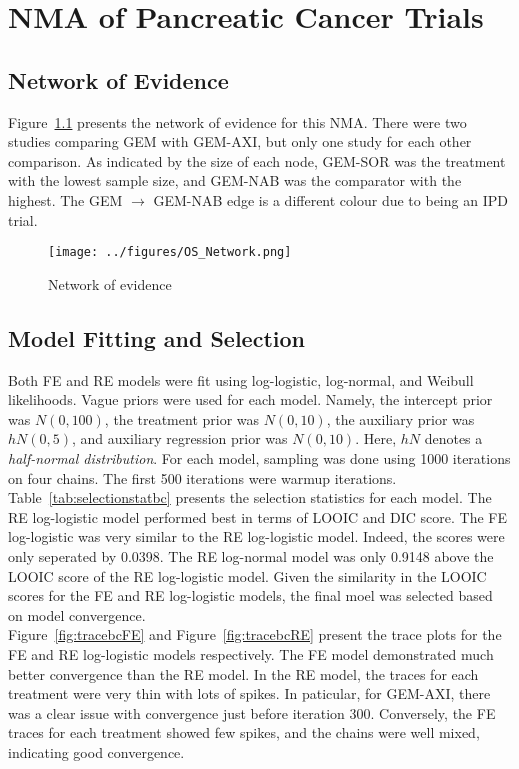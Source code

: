 \chapter{NMA of Pancreatic Cancer Trials}\label{nmachap}

\section{Network of Evidence}
Figure~\ref{fig:osnet} presents the network of evidence for this NMA. There were two studies comparing GEM with GEM-AXI, but only one study for each other comparison. As indicated by the size of each node, GEM-SOR was the treatment with the lowest sample size, and GEM-NAB was the comparator with the highest. The GEM $\to$ GEM-NAB edge is a different colour due to being an IPD trial. 

\begin{figure}[h]
    \centering
    \texttt{[image: ../figures/OS\_Network.png]}
    \caption{Network of evidence}
    \label{fig:osnet}
\end{figure}

\section{Model Fitting and Selection}
Both FE and RE models were fit using log-logistic, log-normal, and Weibull likelihoods. Vague priors were used for each model. Namely, the intercept prior was $N(0, 100)$, the treatment prior was $N(0, 10)$, the auxiliary prior was $hN(0, 5)$, and auxiliary regression prior was $N(0, 10)$. Here, $hN$ denotes a \textit{half-normal distribution}. For each model, sampling was done using 1000 iterations on four chains. The first 500 iterations were warmup iterations. \\

Table~\ref{tab:selectionstatbc} presents the selection statistics for each model. The RE log-logistic model performed best in terms of LOOIC and DIC score. The FE log-logistic was very similar to the RE log-logistic model. Indeed, the scores were only seperated by 0.0398. The RE log-normal model was only 0.9148 above the LOOIC score of the RE log-logistic model. Given the similarity in the LOOIC scores for the FE and RE log-logistic models, the final moel was selected based on model convergence. \\

Figure~\ref{fig:tracebcFE} and Figure~\ref{fig:tracebcRE} present the trace plots for the FE and RE log-logistic models respectively. The FE model demonstrated much better convergence than the RE model. In the RE model, the traces for each treatment were very thin with lots of spikes. In paticular, for GEM-AXI, there was a clear issue with convergence just before iteration 300. Conversely, the FE traces for each treatment showed few spikes, and the chains were well mixed, indicating good convergence. \\

